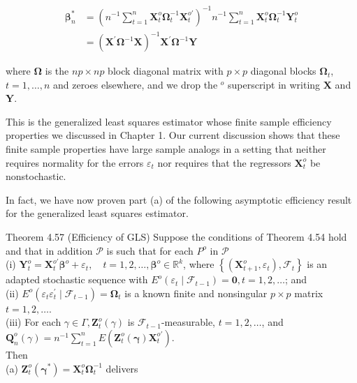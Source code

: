 \documentclass[10pt]{article}
\begin{document}
$$
\begin{aligned}
\boldsymbol{\beta}_{n}^{*} & =\left(n^{-1} \sum_{t=1}^{n} \mathbf{X}_{t}^{o} \boldsymbol{\Omega}_{t}^{-1} \mathbf{X}_{t}^{o \prime}\right)^{-1} n^{-1} \sum_{t=1}^{n} \mathbf{X}_{t}^{o} \boldsymbol{\Omega}_{t}^{-1} \mathbf{Y}_{t}^{o} \\
& =\left(\mathbf{X}^{\prime} \boldsymbol{\Omega}^{-1} \mathbf{X}\right)^{-1} \mathbf{X}^{\prime} \boldsymbol{\Omega}^{-1} \mathbf{Y}
\end{aligned}
$$

where $\boldsymbol{\Omega}$ is the $n p \times n p$ block diagonal matrix with $p \times p$ diagonal blocks $\boldsymbol{\Omega}_{t}$, $t=1, \ldots, n$ and zeroes elsewhere, and we drop the ${ }^{o}$ superscript in writing $\mathbf{X}$ and $\mathbf{Y}$.

This is the generalized least squares estimator whose finite sample efficiency properties we discussed in Chapter 1. Our current discussion shows that these finite sample properties have large sample analogs in a setting that neither requires normality for the errors $\varepsilon_{t}$ nor requires that the regressors $\mathbf{X}_{t}^{o}$ be nonstochastic.

In fact, we have now proven part (a) of the following asymptotic efficiency result for the generalized least squares estimator.

Theorem 4.57 (Efficiency of GLS) Suppose the conditions of Theorem 4.54 hold and that in addition $\mathcal{P}$ is such that for each $P^{o}$ in $\mathcal{P}$\\
(i) $\mathbf{Y}_{t}^{o}=\mathbf{X}_{t}^{o \prime} \boldsymbol{\beta}^{o}+\varepsilon_{t}, \quad t=1,2, \ldots, \boldsymbol{\beta}^{o} \in \mathbb{R}^{k}$, where $\left\{\left(\mathbf{X}_{t+1}^{o}, \varepsilon_{t}\right), \mathcal{F}_{t}\right\}$ is an adapted stochastic sequence with $E^{o}\left(\varepsilon_{t} \mid\right. \left.\mathcal{F}_{t-1}\right)=\mathbf{0}, t=1,2, \ldots$; and\\
(ii) $E^{o}\left(\varepsilon_{t} \varepsilon_{t}^{\prime} \mid \mathcal{F}_{t-1}\right)=\boldsymbol{\Omega}_{t}$ is a known finite and nonsingular $p \times p$ matrix $t=1,2, \ldots$.\\
(iii) For each $\gamma \in \Gamma, \mathbf{Z}_{t}^{o}(\gamma)$ is $\mathcal{F}_{t-1}$-measurable, $t=1,2, \ldots$, and $\mathbf{Q}_{n}^{o}(\gamma)= n^{-1} \sum_{t=1}^{n} E\left(\mathbf{Z}_{t}^{o}(\boldsymbol{\gamma}) \mathbf{X}_{t}^{o \prime}\right)$.\\
Then\\
(a) $\mathbf{Z}_{t}^{o}\left(\boldsymbol{\gamma}^{*}\right)=\mathbf{X}_{t}^{o} \boldsymbol{\Omega}_{t}^{-1}$ delivers
\end{document}
